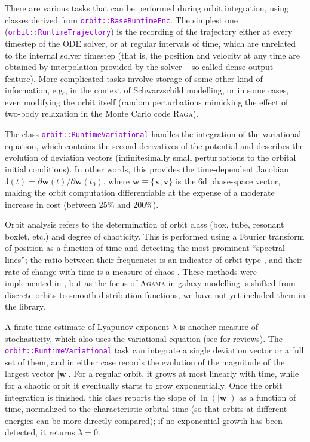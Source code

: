 \documentclass[12pt]{article}
\newcommand{\Agama}{\textsc{Agama}\xspace}
\newcommand{\ttt}[1]{\textcolor{darkviolet}{\texttt{#1}}}
\newcommand{\bv}{\boldsymbol{v}}
\newcommand{\bx}{\boldsymbol{x}}
\begin{document}
There are various tasks that can be performed during orbit integration, using classes derived from \ttt{orbit::BaseRuntimeFnc}. The simplest one (\ttt{orbit::RuntimeTrajectory}) is the recording of the trajectory either at every timestep of the ODE solver, or at regular intervals of time, which are unrelated to the internal solver timestep (that is, the  position and velocity at any time are obtained by interpolation provided by the solver -- so-called dense output feature). More complicated tasks involve storage of some other kind of information, e.g., in the context of Schwarzschild modelling, or in some cases, even modifying the orbit itself (random perturbations mimicking the effect of two-body relaxation in the Monte Carlo code \textsc{Raga}).

The class \ttt{orbit::RuntimeVariational} handles the integration of the variational equation, which contains the second derivatives of the potential and describes the evolution of deviation vectors (infinitesimally small perturbations to the orbital initial conditions). In other words, this provides the time-dependent Jacobian $\mathsf J(t) = \partial \boldsymbol{w}(t)/\partial \boldsymbol{w}(t_0)$, where $\boldsymbol w \equiv \{\bx,\bv\}$ is the 6d phase-space vector, making the orbit computation differentiable at the expense of a moderate increase in cost (between 25\% and 200\%).

Orbit analysis refers to the determination of orbit class (box, tube, resonant boxlet, etc.) and degree of chaoticity. This is performed using a Fourier transform of position as a function of time and detecting the most prominent ``spectral lines''; the ratio between their frequencies is an indicator of orbit type \cite{BinneySpergel1984, CarpinteroAguilar1998}, and their rate of change with time is a measure of chaos \cite{ValluriMerritt1998}. These methods were implemented in \cite{Vasiliev2013}, but as the focus of \Agama in galaxy modelling is shifted from discrete orbits to smooth distribution functions, we have not yet included them in the library.

A finite-time estimate of Lyapunov exponent $\lambda$ is another measure of stochasticity, which also uses the variational equation (see \cite{Carpintero2014, Skokos2010} for reviews). The \ttt{orbit::RuntimeVariational} task can integrate a single deviation vector or a full set of them, and in either case records the evolution of the magnitude of the largest vector $|\boldsymbol w|$. For a regular orbit, it grows at most linearly with time, while for a chaotic orbit it eventually starts to grow exponentially. Once the orbit integration is finished, this class reports the slope of $\ln(|\boldsymbol w|)$ as a function of time, normalized to the characteristic orbital time (so that orbits at different energies can be more directly compared); if no exponential growth has been detected, it returns $\lambda=0$.
\end{document}
